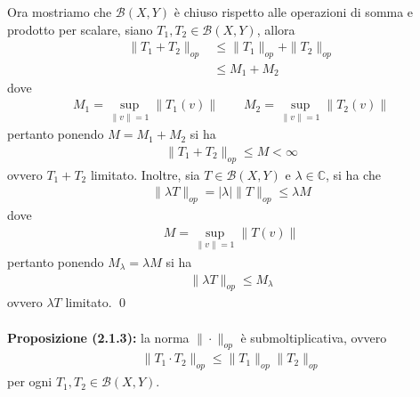 \documentclass{article}
\numberwithin{equation}{subsection}
\begin{document}
Ora mostriamo che $\mathcal{B}(X, Y)$ è chiuso rispetto alle operazioni di somma e prodotto per scalare, siano $T_1, T_2 \in \mathcal{B}(X, Y)$, allora
\begin{align*}
    \|T_1 + T_2\|_{op} &\leq \|T_1\|_{op} + \|T_2\|_{op}  \\
    &\leq M_1 + M_2 
\end{align*}
dove
\begin{align*}
    M_1 = \sup_{\|v\| = 1}\|T_1(v)\| \qquad M_2 = \sup_{\|v\| = 1}\|T_2(v)\| 
\end{align*}
pertanto ponendo $M = M_1 + M_2$ si ha
\begin{align*}
    \|T_1 + T_2\|_{op} \leq M < \infty 
\end{align*}
ovvero $T_1 + T_2$ limitato. Inoltre, sia $T \in \mathcal{B}(X, Y)$ e $\lambda \in \mathbb{C}$, si ha che
\begin{align*}
    \|\lambda T\|_{op} = |\lambda|\|T\|_{op} \leq \lambda M 
\end{align*}
dove
\begin{align*}
    M = \sup_{\|v\| = 1}\|T(v)\| 
\end{align*}
pertanto ponendo $M_\lambda = \lambda M$ si ha
\begin{align*}
    \|\lambda T\|_{op} \leq M_\lambda 
\end{align*}
ovvero $\lambda T$ limitato. \qed \\ \\
\textbf{Proposizione (2.1.3):} la norma $\|\cdot\|_{op}$ è submoltiplicativa, ovvero
\begin{align*}
    \|T_1 \cdot T_2\|_{op} \leq \|T_1\|_{op}\|T_2\|_{op} 
\end{align*}
per ogni $T_1, T_2 \in \mathcal{B}(X, Y)$. \\
\end{document}
